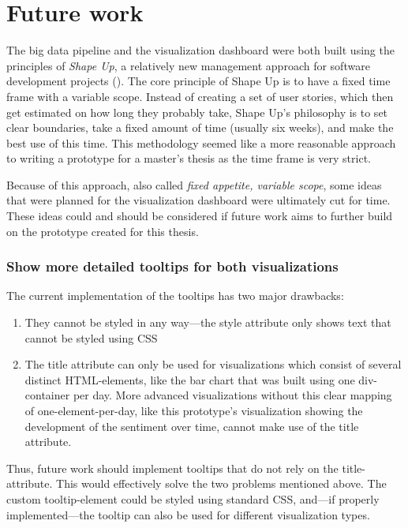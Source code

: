 \section{Future work}\label{sec:cutForTime}

The big data pipeline and the visualization dashboard were both built using the principles of \emph{Shape Up}, a relatively new management approach for software development projects (\cite{singerShapeStopRunning2019}). The core principle of Shape Up is to have a fixed time frame with a variable scope. Instead of creating a set of user stories, which then get estimated on how long they probably take, Shape Up's philosophy is to set clear boundaries, take a fixed amount of time (usually six weeks), and make the best use of this time. This methodology seemed like a more reasonable approach to writing a prototype for a master's thesis as the time frame is very strict.

Because of this approach, also called \emph{fixed appetite, variable scope}, some ideas that were planned for the visualization dashboard were ultimately cut for time. These ideas could and should be considered if future work aims to further build on the prototype created for this thesis.

\subsubsection*{Show more detailed tooltips for both visualizations}\label{fw_tooltips}
The current implementation of the tooltips has two major drawbacks:
\begin{enumerate}
    \item They cannot be styled in any way---the style attribute only shows text that cannot be styled using CSS
    \item The title attribute can only be used for visualizations which consist of several distinct HTML-elements, like the bar chart that was built using one div-container per day. More advanced visualizations without this clear mapping of one-element-per-day, like this prototype's visualization showing the development of the sentiment over time, cannot make use of the title attribute.
\end{enumerate}

Thus, future work should implement tooltips that do not rely on the title-attribute. This would effectively solve the two problems mentioned above. The custom tooltip-element could be styled using standard CSS, and---if properly implemented---the tooltip can also be used for different visualization types. 


